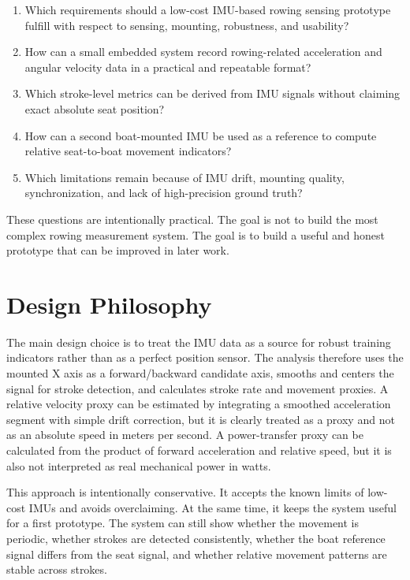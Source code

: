 \begin{enumerate}
  \item Which requirements should a low-cost IMU-based rowing sensing prototype fulfill with respect to sensing, mounting, robustness, and usability?
  \item How can a small embedded system record rowing-related acceleration and angular velocity data in a practical and repeatable format?
  \item Which stroke-level metrics can be derived from IMU signals without claiming exact absolute seat position?
  \item How can a second boat-mounted IMU be used as a reference to compute relative seat-to-boat movement indicators?
  \item Which limitations remain because of IMU drift, mounting quality, synchronization, and lack of high-precision ground truth?
\end{enumerate}

These questions are intentionally practical. The goal is not to build the most complex rowing measurement system. The goal is to build a useful and honest prototype that can be improved in later work.

\section{Design Philosophy}

The main design choice is to treat the IMU data as a source for robust training indicators rather than as a perfect position sensor. The analysis therefore uses the mounted X axis as a forward/backward candidate axis, smooths and centers the signal for stroke detection, and calculates stroke rate and movement proxies. A relative velocity proxy can be estimated by integrating a smoothed acceleration segment with simple drift correction, but it is clearly treated as a proxy and not as an absolute speed in meters per second. A power-transfer proxy can be calculated from the product of forward acceleration and relative speed, but it is also not interpreted as real mechanical power in watts.

This approach is intentionally conservative. It accepts the known limits of low-cost IMUs and avoids overclaiming. At the same time, it keeps the system useful for a first prototype. The system can still show whether the movement is periodic, whether strokes are detected consistently, whether the boat reference signal differs from the seat signal, and whether relative movement patterns are stable across strokes.

